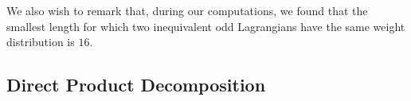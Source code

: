 \documentclass[a4paper,reqno]{amsart}
\theoremstyle{definition}
\theoremstyle{remark} \newtheorem{remark}[theorem]{Remark}
\numberwithin{equation}{section}
\begin{document}
We also wish to remark that, during our computations, we found that the smallest length for which two inequivalent odd Lagrangians have the same weight distribution is \(16\).

\subsection{Direct Product Decomposition}
\end{document}
